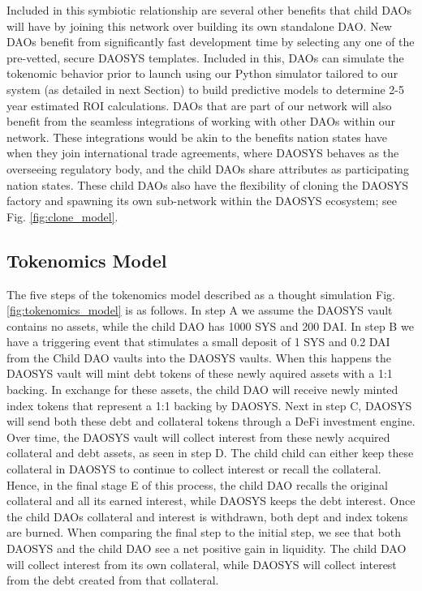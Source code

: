 \documentclass[journal,twocolumn,12pt]{ieeesyscoin}
\begin{document}
Included in this symbiotic relationship are several other benefits that child DAOs will have by joining this network over building its own standalone DAO. New DAOs benefit from significantly fast development time by selecting any one of the pre-vetted, secure DAOSYS templates. Included in this, DAOs can simulate the tokenomic behavior prior to launch using our Python simulator tailored to our system (as detailed in next Section) to build predictive models to determine 2-5 year estimated ROI calculations. DAOs that are part of our network will also benefit from the seamless integrations of working with other DAOs within our network. These integrations would be akin to the benefits nation states have when they join international trade agreements, where DAOSYS behaves as the overseeing regulatory body, and the child DAOs share attributes as participating nation states. These child DAOs also have the flexibility of cloning the DAOSYS factory and spawning its own sub-network within the DAOSYS ecosystem; see Fig. \ref{fig:clone_model}.  

\subsection{Tokenomics Model}
\label{sec:tokenomics_model}

The five steps of the tokenomics model described as a thought simulation Fig. \ref{fig:tokenomics_model} is as follows. In step A we assume the DAOSYS vault contains no assets, while the child DAO has 1000 SYS and 200 DAI. In step B we have a triggering event that stimulates a small deposit of 1 SYS and 0.2 DAI from the Child DAO vaults into the DAOSYS vaults. When this happens the DAOSYS vault will mint debt tokens of these newly aquired assets with a 1:1 backing. In exchange for these assets, the child DAO will receive newly minted index tokens that represent a 1:1 backing by DAOSYS. Next in step C, DAOSYS will send both these debt and collateral tokens through a DeFi investment engine. Over time, the DAOSYS vault will collect interest from these newly acquired collateral and debt assets, as seen in step D. The child child can either keep these collateral in DAOSYS to continue to collect interest or recall the collateral. Hence, in the final stage E of this process, the child DAO recalls the original collateral and all its earned interest, while DAOSYS keeps the debt interest. Once the child DAOs collateral and interest is withdrawn, both dept and index tokens are burned. When comparing the final step to the initial step, we see that both DAOSYS and the child DAO see a net positive gain in liquidity. The child DAO will collect interest from its own collateral, while DAOSYS will collect interest from the debt created from that collateral. 
\end{document}
